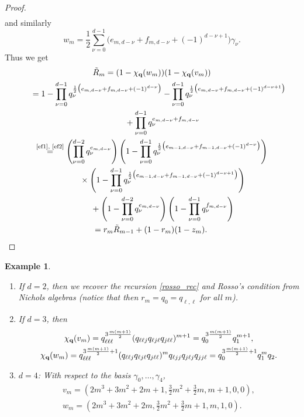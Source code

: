 \documentclass[10pt,a4paper]{amsart}
\numberwithin{equation}{section}
\newtheorem{Example}[Theorem]{Example}
\newcommand{\qq }{{\bf q}}
\newcommand{\dn }{d}
\newcommand{\qR }{\tilde R}
\newcommand{\bich }{\chi}
\begin{document}
\begin{proof}
\begin{align*}
\end{align*}
and similarly
\[ w_m = \frac{1}{2}\sum_{\nu=0}^{d-1}\big(e_{m,\dn-\nu}+f_{m,\dn-\nu}+(-1)^{\dn-\nu+1}\big)\gamma_\nu. \]
Thus we get
\begin{gather*}
\qR_m = (1-\bich_\qq(w_m))(1-\bich_\qq(v_m)) \\
\hphantom{\qR_m }{}= 1
-\prod_{\nu=0}^{\dn-1} q_\nu^{\frac{1}{2}\big(e_{m,\dn-\nu}+f_{m,\dn-\nu}+(-1)^{\dn-\nu}\big)}
-\prod_{\nu=0}^{\dn-1} q_\nu^{\frac{1}{2}\big(e_{m,\dn-\nu}+f_{m,\dn-\nu}+(-1)^{\dn-\nu+1}\big)} \\
\hphantom{\qR_m=}{}+\prod_{\nu=0}^{\dn-1} q_\nu^{e_{m,\dn-\nu}+f_{m,\dn-\nu}} \\
\stackrel{\text{\eqref{ef1}, \eqref{ef2}}}{=}
 \left( \prod_{\nu=0}^{d-2} q_\nu^{e_{m,\dn-\nu}} \right)
\left( 1-\prod_{\nu=0}^{\dn-1} q_\nu^{\frac{1}{2}\big(e_{m-1,\dn-\nu}+f_{m-1,\dn-\nu}+(-1)^{\dn-\nu}\big)} \right)
\\
\hphantom{\qR_m=}{}\times\left( 1-\prod_{\nu=0}^{\dn-1} q_\nu^{\frac{1}{2}\big(e_{m-1,\dn-\nu}+f_{m-1,\dn-\nu}+(-1)^{\dn-\nu+1}\big)} \right)
 \\
\hphantom{\qR_m=}{}+ \left(1-\prod_{\nu=0}^{d-2} q_\nu^{e_{m,\dn-\nu}} \right) \left(1-\prod_{\nu=0}^{d-1} q_\nu^{f_{m,\dn-\nu}} \right) \\
\hphantom{\qR_m}{}=r_m \qR_{m-1}+(1-r_m)(1-z_m).\tag*{\qed}
\end{gather*}\renewcommand{\qed}{}
\end{proof}


\begin{Example}\quad
\begin{enumerate}\itemsep=0pt
\item If $\dn=2$, then we recover the recursion \eqref{rosso_rec} and Rosso's condition from Nichols algebras (notice that then $r_m=q_0=q_{\ell,\ell}$ for all $m$).
\item If $\dn=3$, then
\begin{gather*}
\chi_\qq(v_m) = q_{\ell\ell\ell}^{3\frac{m(m+1)}{2}}(q_{\ell\ell j}q_{\ell j\ell}q_{j \ell\ell})^{m+1}
= q_{0}^{3\frac{m(m+1)}{2}}q_{1}^{m+1}, \\
\chi_\qq(w_m) = q_{\ell\ell\ell}^{3\frac{m(m+1)}{2}+1}(q_{\ell\ell j}q_{\ell j\ell}q_{j \ell\ell})^{m}
q_{\ell j j}q_{j \ell j}q_{j j \ell}
= q_{0}^{3\frac{m(m+1)}{2}+1}q_{1}^{m} q_{2}.
\end{gather*}
\item $d=4$: With respect to the basis $\gamma_0,\dots,\gamma_4$,
\begin{gather*}
v_m = \left( 2m^3+3m^2+2m+1,
\frac{3}{2}m^2+\frac{3}{2}m,
m+1,
0,
0\right), \\
w_m = \left(2 m^3+3 m^2+2m,
\frac{3}{2}m^2+\frac{3}{2}m+1,
m,
1,
0
\right).
\end{gather*}
\end{enumerate}
\end{Example}
\end{document}
